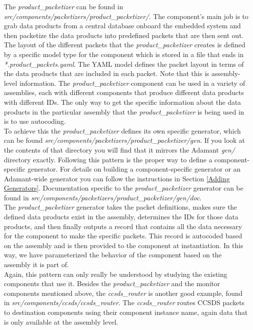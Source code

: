 The \textit{product\_packetizer} can be found in \textit{src/components/packetizers/product\_packetizer/}. The component's main job is to grab data products from a central database onboard the embedded system and then packetize the data products into predefined packets that are then sent out. The layout of the different packets that the \textit{product\_packetizer} creates is defined by a specific model type for the component which is stored in a file that ends in \textit{*.product\_packets.yaml}. The YAML model defines the packet layout in terms of the data products that are included in each packet. Note that this is assembly-level information. The \textit{product\_packetizer} component can be used in a variety of assemblies, each with different components that produce different data products with different IDs. The only way to get the specific information about the data products in the particular assembly that the \textit{product\_packetizer} is being used in is to use autocoding. \\

To achieve this the \textit{product\_packetizer} defines its own specific generator, which can be found \textit{src/components/packetizers/product\_packetizer/gen}. If you look at the contents of that directory you will find that it mirrors the Adamant \textit{gen/} directory exactly. Following this pattern is the proper way to define a component-specific generator. For details on building a component-specific generator or an Adamant-wide generator you can follow the instructions in Section \ref{Adding Generators}. Documentation specific to the \textit{product\_packetizer} generator can be found in \textit{src/components/packetizers/product\_packetizer/gen/doc}. \\

The \textit{product\_packetizer} generator takes the packet definitions, makes sure the defined data products exist in the assembly, determines the IDs for those data products, and then finally outputs a record that contains all the data necessary for the component to make the specific packets. This record is autocoded based on the assembly and is then provided to the component at instantiation. In this way, we have parameterized the behavior of the component based on the assembly it is part of. \\

Again, this pattern can only really be understood by studying the existing components that use it. Besides the \textit{product\_packetizer} and the monitor components mentioned above, the \textit{ccsds\_router} is another good example, found in \textit{src/components/ccsds/ccsds\_router}. The \textit{ccsds\_router} routes CCSDS packets to destination components using their component instance name, again data that is only available at the assembly level.

